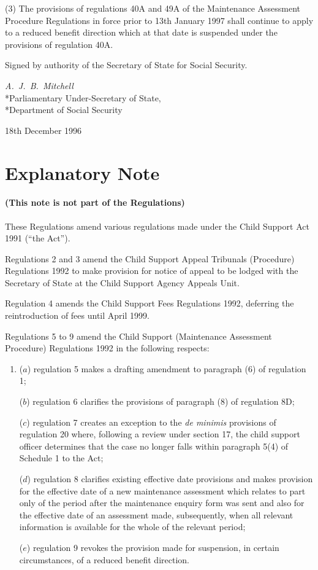\documentclass[a4paper]{article}
\newcommand{\parthead}{}
\begin{document}
(3) The provisions of regulations 40A and 49A of the Maintenance Assessment Procedure Regulations in force prior to 13th January 1997 shall continue to apply to a reduced benefit direction which at that date is suspended under the provisions of regulation 40A.

\bigskip

Signed by authority of the Secretary of State for Social Security.

{\raggedleft
\emph{A.\ J.\ B.\ Mitchell}\\*Parliamentary Under-Secretary of
State,\\*Department of Social Security

}

18th December 1996

\part{Explanatory Note}

\renewcommand\parthead{--- Explanatory Note}

\subsection*{(This note is not part of the Regulations)}

These Regulations amend various regulations made under the Child Support Act 1991 (“the Act”).

  Regulations 2 and 3 amend the Child Support Appeal Tribunals (Procedure) Regulations 1992 to make provision for notice of appeal to be lodged with the Secretary of State at the Child Support Agency Appeals Unit.

  Regulation 4 amends the Child Support Fees Regulations 1992, deferring the reintroduction of fees until April 1999.

 Regulations 5 to 9 amend the Child Support (Maintenance Assessment Procedure) Regulations 1992 in the following respects:
\begin{enumerate}\item[]
 ($a$) regulation 5 makes a drafting amendment to paragraph (6) of regulation 1;

 ($b$) regulation 6 clarifies the provisions of paragraph (8) of regulation 8D;

 ($c$) regulation 7 creates an exception to the \emph{de minimis} provisions of regulation 20 where, following a review under section 17, the child support officer determines that the case no longer falls within paragraph 5(4) of Schedule 1 to the Act;

 ($d$) regulation 8 clarifies existing effective date provisions and makes provision for the effective date of a new maintenance assessment which relates to part only of the period after the maintenance enquiry form was sent and also for the effective date of an assessment made, subsequently, when all relevant information is available for the whole of the relevant period;

 ($e$) regulation 9 revokes the provision made for suspension, in certain circumstances, of a reduced benefit direction.
\end{enumerate}
\end{document}

